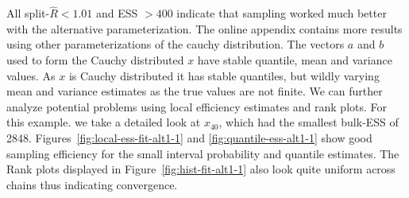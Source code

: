 \documentclass[american,]{article}
\begin{document}

All split-\(\widehat{R}<1.01\) and ESS \(>400\) indicate that
sampling worked much better with the alternative parameterization.
The online appendix contains more results using other parameterizations 
of the cauchy distribution. The vectors \(a\) and \(b\) used
to form the Cauchy distributed \(x\) have stable quantile, mean and
variance values. As \(x\) is Cauchy distributed it has stable
quantiles, but wildly varying mean and variance estimates as the true values
are not finite.
%
We can further analyze potential problems using local efficiency
estimates and rank plots. For this example. we take a detailed look at 
\(x_{40}\), which had the smallest bulk-ESS of 2848.
%
Figures~\ref{fig:local-ess-fit-alt1-1} and
\ref{fig:quantile-ess-alt1-1} show good sampling efficiency for the
small interval probability and quantile estimates.
%
The Rank plots displayed in Figure~\ref{fig:hist-fit-alt1-1} also look quite 
uniform across chains thus indicating convergence.
\end{document}
